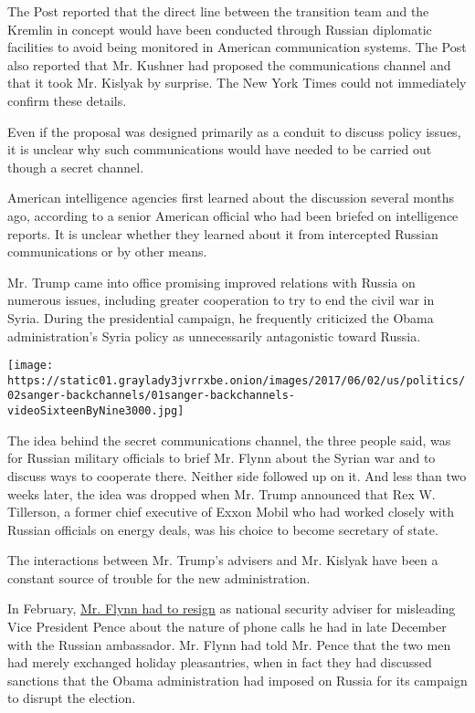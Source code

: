 The Post reported that the direct line between the transition team and
the Kremlin in concept would have been conducted through Russian
diplomatic facilities to avoid being monitored in American communication
systems. The Post also reported that Mr. Kushner had proposed the
communications channel and that it took Mr. Kislyak by surprise. The New
York Times could not immediately confirm these details.

Even if the proposal was designed primarily as a conduit to discuss
policy issues, it is unclear why such communications would have needed
to be carried out though a secret channel.

American intelligence agencies first learned about the discussion
several months ago, according to a senior American official who had been
briefed on intelligence reports. It is unclear whether they learned
about it from intercepted Russian communications or by other means.

Mr. Trump came into office promising improved relations with Russia on
numerous issues, including greater cooperation to try to end the civil
war in Syria. During the presidential campaign, he frequently criticized
the Obama administration's Syria policy as unnecessarily antagonistic
toward Russia.

\texttt{[image: https://static01.graylady3jvrrxbe.onion/images/2017/06/02/us/politics/02sanger-backchannels/01sanger-backchannels-videoSixteenByNine3000.jpg]}

The idea behind the secret communications channel, the three people
said, was for Russian military officials to brief Mr. Flynn about the
Syrian war and to discuss ways to cooperate there. Neither side followed
up on it. And less than two weeks later, the idea was dropped when Mr.
Trump announced that Rex W. Tillerson, a former chief executive of Exxon
Mobil who had worked closely with Russian officials on energy deals, was
his choice to become secretary of state.

The interactions between Mr. Trump's advisers and Mr. Kislyak have been
a constant source of trouble for the new administration.

In February,
\href{https://www.nytimes3xbfgragh.onion/2017/02/13/us/politics/donald-trump-national-security-adviser-michael-flynn.html?_r=0}{Mr.
Flynn had to resign} as national security adviser for misleading Vice
President Pence about the nature of phone calls he had in late December
with the Russian ambassador. Mr. Flynn had told Mr. Pence that the two
men had merely exchanged holiday pleasantries, when in fact they had
discussed sanctions that the Obama administration had imposed on Russia
for its campaign to disrupt the election.

